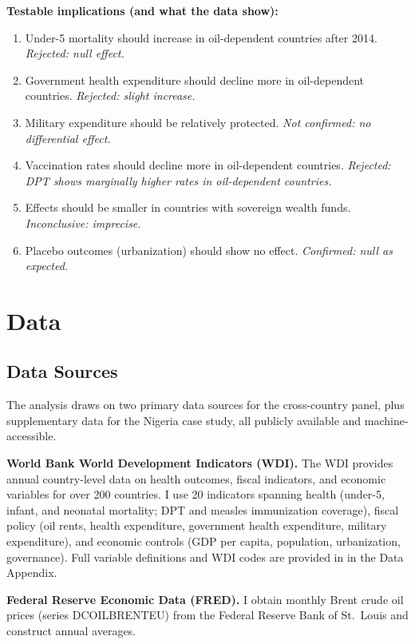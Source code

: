 \documentclass[12pt]{article}
\begin{document}
\textbf{Testable implications (and what the data show):}
\begin{enumerate}
\item Under-5 mortality should increase in oil-dependent countries after 2014. \textit{Rejected: null effect.}
\item Government health expenditure should decline more in oil-dependent countries. \textit{Rejected: slight increase.}
\item Military expenditure should be relatively protected. \textit{Not confirmed: no differential effect.}
\item Vaccination rates should decline more in oil-dependent countries. \textit{Rejected: DPT shows marginally higher rates in oil-dependent countries.}
\item Effects should be smaller in countries with sovereign wealth funds. \textit{Inconclusive: imprecise.}
\item Placebo outcomes (urbanization) should show no effect. \textit{Confirmed: null as expected.}
\end{enumerate}


\section{Data}
\label{sec:data}

\subsection{Data Sources}

The analysis draws on two primary data sources for the cross-country panel, plus supplementary data for the Nigeria case study, all publicly available and machine-accessible.

\textbf{World Bank World Development Indicators (WDI).} The WDI provides annual country-level data on health outcomes, fiscal indicators, and economic variables for over 200 countries. I use 20 indicators spanning health (under-5, infant, and neonatal mortality; DPT and measles immunization coverage), fiscal policy (oil rents, health expenditure, government health expenditure, military expenditure), and economic controls (GDP per capita, population, urbanization, governance). Full variable definitions and WDI codes are provided in  in the Data Appendix.

\textbf{Federal Reserve Economic Data (FRED).} I obtain monthly Brent crude oil prices (series DCOILBRENTEU) from the Federal Reserve Bank of St.\ Louis and construct annual averages.
\end{document}
